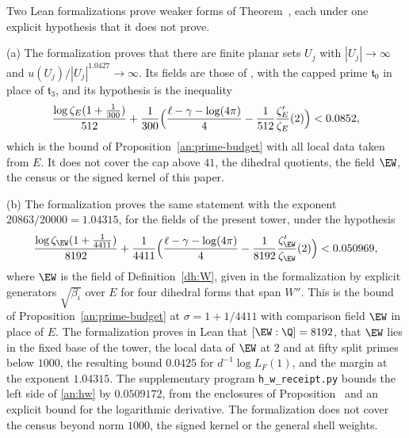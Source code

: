 \begin{remark}\label{an:lean-hypothesis}
Two Lean formalizations prove weaker forms of Theorem~, each
under one explicit hypothesis that it does not prove.

(a) The formalization \cite{NaslundLean2026} proves that there are finite
planar sets $U_j$ with $|U_j|\to\infty$ and
$u(U_j)/|U_j|^{1.0427}\to\infty$. Its fields are
those of \cite{Naslund04273}, with the capped prime $\mathfrak t_0$ in place
of $\mathfrak t_3$, and its hypothesis is the inequality
\begin{equation}\label{an:h241}
 \frac{\log\zeta_E(1+\frac1{300})}{512}
 +\frac1{300}\Bigl(\frac{\ell-\gamma-\log(4\pi)}4
 -\frac1{512}\frac{\zeta_E'}{\zeta_E}(2)\Bigr)<0.0852,
\end{equation}
which is the bound of Proposition~\ref{an:prime-budget} with all local data
taken from $E$. It does not cover the cap above $41$, the dihedral
quotients, the field $\EW$, the census or the signed kernel of this paper.

(b) The formalization \cite{NaslundLeanW} proves the same statement with the
exponent $20863/20000=1.04315$, for the fields of the present tower, under the
hypothesis
\begin{equation}\label{an:hw}
 \frac{\log\zeta_{\EW}(1+\frac1{4411})}{8192}
 +\frac1{4411}\Bigl(\frac{\ell-\gamma-\log(4\pi)}4
 -\frac1{8192}\frac{\zeta_{\EW}'}{\zeta_{\EW}}(2)\Bigr)<0.050969,
\end{equation}
where $\EW$ is the field of Definition~\ref{dh:W}, given in the
formalization by explicit generators $\sqrt{\beta_i}$ over $E$ for four
dihedral forms that span $W''$. This is the bound of
Proposition~\ref{an:prime-budget} at $\sigma=1+1/4411$ with comparison field
$\EW$ in place of $E$. The formalization proves in Lean that
$[\EW:\Q]=8192$, that $\EW$ lies in the fixed base of the tower, the local
data of $\EW$ at $2$ and at fifty split primes below $1000$, the resulting
bound $0.0425$ for $d^{-1}\log L_F(1)$, and the margin at the exponent
$1.04315$. The supplementary program \texttt{h\_w\_receipt.py} bounds the
left side of \eqref{an:hw} by $0.0509172$, from the enclosures of
Proposition~ and an explicit bound for the logarithmic
derivative. The formalization does not cover the census beyond norm $1000$,
the signed kernel or the general shell weights.
\end{remark}

